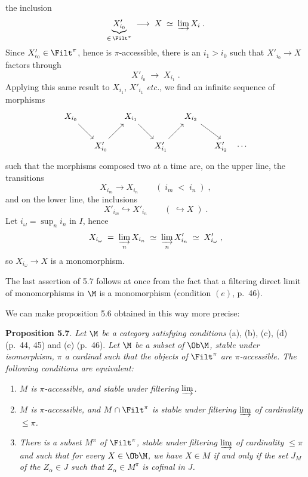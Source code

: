 the inclusion
\[
\underbrace{X'_{i_0}}_{\in\, \Filt^\pi} \;\longrightarrow\; X \;\simeq\; \varinjlim X_i \;.
\]
Since $X'_{i_0} \in \Filt^\pi$, hence is $\pi$-accessible, there is an $i_1 > i_0$ such that $X'_{i_0} \longrightarrow X$ factors through
\[
X'_{i_0} \;\longrightarrow\; X_{i_1} \;.
\]
Applying this same result to $X_{i_1}$, $X'_{i_1}$ \textit{etc.}, we find an infinite sequence of morphisms
\[
\begin{tikzcd}[column sep=small]
X_{i_0} \arrow[dr] & & X_{i_1} \arrow[dr] & & X_{i_2} \arrow[dr] & \\
& X'_{i_0} \arrow[ur] & & X'_{i_1} \arrow[ur] & & X'_{i_2} \quad \cdots
\end{tikzcd}
\]
such that the morphisms composed two at a time are, on the upper line, the transitions
\[
X_{i_m} \longrightarrow X_{i_n} \qquad (\; i_m \;<\; i_n \;) \;,
\]
and on the lower line, the inclusions
\[
X'_{i_m} \hookrightarrow X'_{i_n} \qquad (\; \hookrightarrow X \;) \;.
\]
Let $i_\omega = \sup_n i_n$ in $I$, hence
\[
X_{i_\omega} \;=\; \varinjlim_{n} X_{i_n} \;\simeq\; \varinjlim_{n} X'_{i_n} \;\simeq\; X'_{i_\omega} \;,
\]
so $X_{i_\omega} \longrightarrow X$ is a monomorphism.


The last assertion of 5.7 follows at once from the fact that a filtering direct limit of monomorphisms in $\M$ is a monomorphism (condition $(e)$, p.~46).

We can make proposition 5.6 obtained in this way more precise:

\textbf{Proposition 5.7}. \textit{Let $\M$ be a category satisfying conditions} (a), (b), (c), (d) (p.~44, 45) and (e) (p.~46). \textit{Let $\M$ be a subset of} $\Ob\M$\textit{, stable under isomorphism, $\pi$ a cardinal such that the objects of} $\Filt^\pi$ \textit{are $\pi$-accessible. The following conditions are equivalent:} %

\begin{enumerate}[label={}]
\item[a)] \textit{$M$ is $\pi$-accessible, and stable under filtering $\varinjlim$.}
\item[b)] \textit{$M$ is $\pi$-accessible, and $M \cap \Filt^\pi$ is stable under filtering $\varinjlim$ of cardinality $\leq \pi$.}
\item[c)] \textit{There is a subset $M^\pi$ of} $\Filt^\pi$\textit{, stable under filtering $\varinjlim$ of cardinality $\leq \pi$ and such that for every $X \in \Ob\M$, we have $X \in M$ if and only if the set $J_M$ of the $Z_\alpha \in J$ such that $Z_\alpha \in M^\pi$ is cofinal in $J$.}
\end{enumerate}

